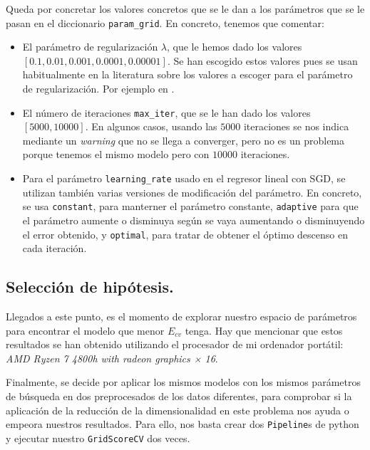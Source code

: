 \documentclass[a4paper, 20pt]{article}
\begin{document}
Queda por concretar los valores concretos que se le dan a los parámetros que se le pasan en el diccionario \lstinline{param_grid}. En concreto, tenemos que comentar:

\begin{itemize}
\item El parámetro de regularización $\lambda$, que le hemos dado los valores $[0.1,0.01,0.001,0.0001,0.00001]$. Se han escogido estos valores pues se usan habitualmente en la literatura sobre los valores a escoger para el parámetro de regularización. Por ejemplo en \cite{2013applied}.

\item El número de iteraciones \lstinline{max_iter}, que se le han dado los valores $[5000,10000]$. En algunos casos, usando las $5000$ iteraciones se nos indica mediante un \emph{warning} que no se llega a converger, pero no es un problema porque tenemos el mismo modelo pero con $10000$ iteraciones.

  \item Para el parámetro \lstinline{learning_rate} usado en el regresor lineal con SGD, se utilizan también varias versiones de modificación del parámetro. En concreto, se usa \lstinline{constant}, para manterner el parámetro constante, \lstinline{adaptive} para que el parámetro aumente o disminuya según se vaya aumentando o disminuyendo el error obtenido, y \lstinline{optimal}, para tratar de obtener el óptimo descenso en cada iteración.

\end{itemize}


\subsection{Selección de hipótesis.}

Llegados a este punto, es el momento de explorar nuestro espacio de parámetros para encontrar el modelo que menor $E_{cv}$  tenga. Hay que mencionar que estos resultados se han obtenido utilizando el procesador de mi ordenador portátil: \emph{AMD Ryzen 7 4800h with radeon graphics × 16}.

Finalmente, se decide por aplicar los mismos modelos con los mismos parámetros de búsqueda en dos preprocesados de los datos diferentes, para comprobar si la aplicación de la reducción de la dimensionalidad en este problema nos ayuda o empeora nuestros resultados. Para ello, nos basta crear dos \lstinline{Pipeline}s de python y ejecutar nuestro \lstinline{GridScoreCV} dos veces.
\end{document}
